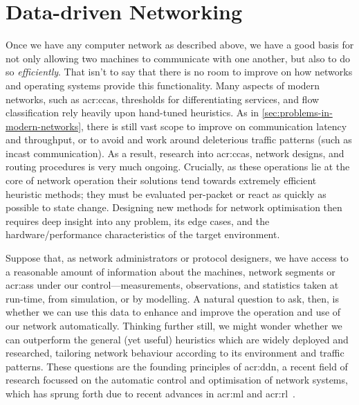 \chapter{Data-driven Networking}
Once we have any computer network as described above, we have a good basis for not only allowing two machines to communicate with one another, but also to do so \emph{efficiently}.
That isn't to say that there is no room to improve on how networks and operating systems provide this functionality.
Many aspects of modern networks, such as \glspl{acr:cca}, thresholds for differentiating services, and flow classification rely heavily upon hand-tuned heuristics.
As in \cref{sec:problems-in-modern-networks}, there is still vast scope to improve on communication latency and throughput, or to avoid and work around deleterious traffic patterns (such as incast communication).
As a result, research into \glspl{acr:cca}, network designs, and routing procedures is very much ongoing.
Crucially, as these operations lie at the core of network operation their solutions tend towards extremely efficient heuristic methods; they must be evaluated per-packet or react as quickly as possible to state change.
Designing new methods for network optimisation then requires deep insight into any problem, its edge cases, and the hardware/performance characteristics of the target environment.

Suppose that, as network administrators or protocol designers, we have access to a reasonable amount of information about the machines, network segments or \glspl{acr:as} under our control---measurements, observations, and statistics taken at run-time, from simulation, or by modelling.
A natural question to ask, then, is whether we can use this data to enhance and improve the operation and use of our network automatically.
Thinking further still, we might wonder whether we can outperform the general (yet useful) heuristics which are widely deployed and researched, tailoring network behaviour according to its environment and traffic patterns.
These questions are the founding principles of \gls{acr:ddn}, a recent field of research focussed on the automatic control and optimisation of network systems, which has sprung forth due to recent advances in \gls{acr:ml} and \gls{acr:rl}~\parencite{DBLP:conf/anrw/FeamsterR18,DBLP:journals/pieee/KellererKBBR019}.

